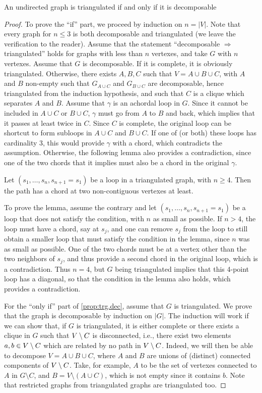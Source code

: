 \begin{proposition}
\label{prop:trg.dec}
An undirected graph is triangulated if and only if it is decomposable
\end{proposition}
\begin{proof}
To prove the ``if'' part, we proceed by induction on $n=|V|$. Note that every graph for $n\leq3$ is both decomposable and triangulated (we leave the verification to the reader).  Assume that the statement ``decomposable $\Rightarrow$ triangulated'' holds for graphs with less than $n$ vertexes, and take $G$ with $n$ vertexes. Assume that $G$ is decomposable. If it is complete, it is obviously triangulated. Otherwise, there exists $A,B,C$ such that  $V = A\cup B \cup C$, with $A$ and $B$ non-empty such
that $G_{A\cup C}$ and $G_{B\cup C}$ are decomposable, hence triangulated from the induction hypothesis,  and such that $C$ is a
clique which separates $A$ and $B$.  Assume that $\gamma$ is an achordal loop in $G$. Since it cannot be included in $A\cup C$ or
$B\cup C$, $\gamma$ must  go from $A$ to $B$ and back, which implies that it
passes at least twice in $C$. Since $C$ is complete, the original loop can be shortcut to form subloops   in $A\cup C$ and $B\cup C$. If one of (or both) these loops has cardinality 3, this would provide $\gamma$ with a chord, which contradicts the assumption. Otherwise, the following lemma also provides a contradiction, since one of the two chords that it implies must also be a chord in the original $\gamma$. 

\begin{lemma}
Let $(s_1, \ldots, s_n, s_{n+1}=s_1)$ be a loop in a triangulated graph, with $n\geq 4$. Then the path has a chord at  two non-contiguous vertexes at least. 
\end{lemma}
To prove the lemma, assume the contrary and let $(s_1, \ldots, s_n, s_{n+1}=s_1)$ be a loop that does not satisfy the condition, with $n$ as small as possible. If $n > 4$, the loop must have a chord, say at $s_j$, and one can remove $s_j$ from the loop to still obtain a smaller loop that must satisfy the condition in the  lemma, since $n$ was as small as possible. One of the two chords must be at a vertex other than the two neighbors of $s_j$, and thus provide a second chord in the original loop, which is a contradiction. Thus $n=4$, but $G$ being triangulated implies that this 4-point loop has a diagonal, so that the condition in the lemma also holds, which provides a contradiction.

For the ``only if'' part of \cref{prop:trg.dec}, assume that $G$ is triangulated. We prove
that the graph is decomposable by induction on $|G|$.  The induction
will work if we can show that, if $G$ is triangulated, it is either
complete or there exists a clique in $G$ such that $V\setminus C$ is
disconnected, i.e., there exist two elements $a, b\in V\setminus C$ which are
related by no path in $V\setminus C$. Indeed, we will then be able to
decompose $V = A\cup B\cup C$, where $A$ and $B$ are unions of
(distinct) connected components of $V\setminus C$. Take, for example, $A$ to be the set of vertexes connected to $A$ in $G\setminus C$, and $B = V\setminus (A\cup C)$, which is not empty since it contains $b$. Note that restricted graphs from
triangulated graphs are triangulated too. 


\end{proof}
